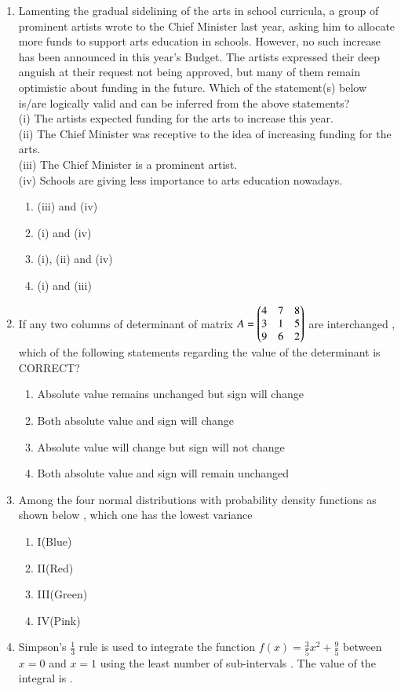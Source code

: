 \documentclass[journal]{IEEEtran}
\begin{document}
\begin{enumerate}
\item Lamenting the gradual sidelining of the arts in school curricula, a group of prominent artists wrote to the Chief Minister last year, asking him to allocate more funds to support arts education in schools. However, no such increase has been announced in this year's Budget. The artists expressed their deep anguish at their request not being approved, but many of them remain optimistic about funding in the future.
Which of the statement(s) below is/are logically valid and can be inferred from the above statements?\\
(i) The artists expected funding for the arts to increase this year.\\
(ii) The Chief Minister was receptive to the idea of increasing funding for the arts.\\
(iii) The Chief Minister is a prominent artist.\\
(iv) Schools are giving less importance to arts education nowadays.

			\begin{enumerate}
\item  (iii) and (iv)
\item (i) and (iv)
\item (i), (ii) and (iv)
\item (i) and (iii)
   \end{enumerate}

  \item If any two columns of determinant  of matrix $A =\begin{pmatrix}4 & 7 & 8\\ 3 & 1 & 5\\ 9 & 6 & 2\end{pmatrix}$ are interchanged , which of the following statements regarding the value of the determinant is CORRECT?
\begin{enumerate}
    \item Absolute value remains unchanged but sign will change
    \item Both absolute value and sign will change
    \item Absolute value will change but sign will not change
    \item Both absolute value and sign will remain unchanged
\end{enumerate}

  \item Among the four normal distributions with probability density functions as shown below , which one has the lowest variance
  
  
  
\begin{enumerate}
    \item I(Blue)
    \item II(Red)
    \item III(Green)
    \item IV(Pink)
\end{enumerate}

\item Simpson's $\frac{1}{3}$ rule is used to integrate the function $f(x)=\frac{3}{5}x^2+\frac{9}{5}$ between $x=0$ and $x=1$ using the least number of sub-intervals . The value of the integral is .




\end{enumerate}
\end{document}
